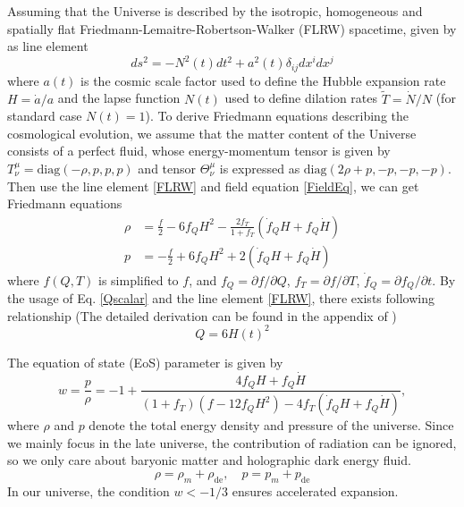\documentclass[a4paper,fleqn]{cas-sc}
\begin{document}
Assuming that the Universe is described by the isotropic, homogeneous and spatially flat Friedmann-Lemaitre-Robertson-Walker (FLRW) spacetime, given by as line element
\begin{equation}
ds^2=-N^2(t)dt^2+a^2(t)\delta_{ij} dx^i dx^j\label{FLRW}
\end{equation}
where $a(t)$ is the cosmic scale factor
used to define the Hubble expansion rate $H=\dot{a}/a$ and the lapse function $N(t)$ used to define dilation rates $\tilde{T}=\dot{N}/N$ (for standard case $N(t)=1$). To derive Friedmann equations describing the cosmological evolution, we assume that the matter content of the Universe consists of a perfect fluid, whose  energy-momentum tensor is given by $T^{\mu}_\nu=\text{diag}(-\rho,p,p,p)$ and tensor $\Theta^{\mu}_\nu$ is expressed as $\text{diag}(2\rho+p,-p,-p,-p)$. Then use the line element \eqref{FLRW} and field equation \eqref{FieldEq}, we can get Friedmann equations
\begin{align}
\rho &=\frac{f}{2}-6f_Q H^2-\frac{2f_T}{1+f_T}(\dot{f}_QH+f_Q \dot{H}) \\
p &=-\frac{f}{2}+6f_Q H^2+2(\dot{f}_QH+f_Q \dot{H})
\end{align}
where $f(Q,T)$ is simplified to $f$, and $f_Q=\partial f/\partial Q$, $f_T=\partial f/\partial T$, $\dot{f}_Q=\partial f_Q/\partial t$. By the usage of Eq. \eqref{Qscalar} and the line element \eqref{FLRW}, there exists following relationship (The detailed derivation can be found in the appendix of \cite{Xu_2019})
\begin{equation}
    Q=6H(t)^2
\end{equation}

The equation of state (EoS) parameter is given by
\begin{equation}
    w=\frac{p}{\rho}=-1+\frac{4 f_Q H+f_Q \dot{H}}{(1+f_T)(f-12f_QH^2)-4 f_T(\dot{f}_QH+f_Q \dot{H})},
\end{equation}
where $\rho$ and $p$ denote the total energy density and pressure of the universe. Since we mainly focus in the late universe, the contribution of radiation can be ignored, so we only care about baryonic matter and holographic dark energy fluid.
\begin{equation}
    \rho=\rho_m+\rho_\text{de}, \quad p=p_m+p_\text{de}
\end{equation}
In our universe, the condition $w < -1/3$ ensures accelerated expansion. 
\end{document}
